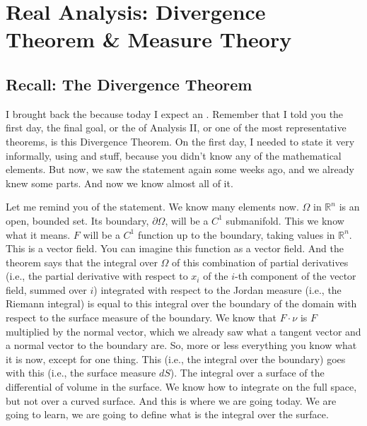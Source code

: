 \chapter{Real Analysis: Divergence Theorem \& Measure Theory}

\section{Recall: The Divergence Theorem}

\begin{spoken-clean}[00:00:00 - 00:02:19]
I brought back the  because today I expect an . Remember that I told you the first day, the final goal, or the  of Analysis II, or one of the most representative theorems, is this Divergence Theorem. On the first day, I needed to state it very informally, using  and stuff, because you didn't know any of the mathematical elements. But now, we saw the statement again some weeks ago, and we already knew some parts. And now we know almost all of it.

Let me remind you of the statement. We know many elements now. $\Omega$ in $\mathbb{R}^n$ is an open, bounded set. Its boundary, $\partial\Omega$, will be a $C^1$ submanifold. This we know what it means. $F$ will be a $C^1$ function up to the boundary, taking values in $\mathbb{R}^n$. This is a vector field. You can imagine this function as a vector field. And the theorem says that the integral over $\Omega$ of this combination of partial derivatives (i.e., the partial derivative with respect to $x_i$ of the $i$-th component of the vector field, summed over $i$) integrated with respect to the Jordan measure (i.e., the Riemann integral) is equal to this integral over the boundary of the domain with respect to the surface measure of the boundary. We know that $F \cdot \nu$ is $F$ multiplied by the normal vector, which we already saw what a tangent vector and a normal vector to the boundary are. So, more or less everything you know what it is now, except for one thing. This (i.e., the integral over the boundary) goes with this (i.e., the surface measure $dS$). The integral over a surface of the differential of volume in the surface. We know how to integrate on the full space, but not over a curved surface. And this is where we are going today. We are going to learn, we are going to define what is the integral over the surface.
\end{spoken-clean}

